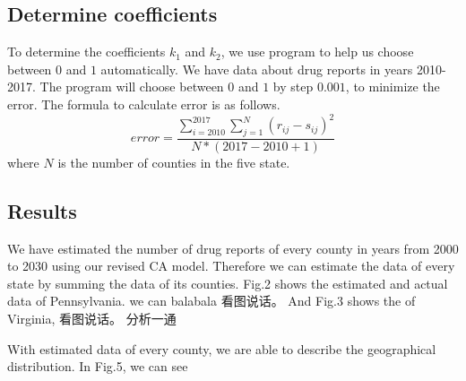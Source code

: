 		\subsection{Determine coefficients} \label{Section:Determine coefficients}
		To determine the coefficients $k_1$ and $k_2$, we use program to help us choose between $0$ and $1$ automatically. We have data about drug reports in years 2010-2017. The program will choose between $0$ and $1$ by step $0.001$, to minimize the error. The formula to calculate error is as follows.
			$$error = \frac{\sum_{i=2010}^{2017} \sum_{j=1}^{N} (r_{ij} - s_{ij})^2  }{N * (2017-2010+1)}$$
		where $N$ is the number of counties in the five state.


		\subsection{Results}
			We have estimated the number of drug reports of every county in years from 2000 to 2030 using our revised CA model. Therefore we can estimate the data of every state by summing the data of its counties. Fig.2 shows the estimated and actual data of Pennsylvania. we can balabala 看图说话。 And Fig.3 shows the   of Virginia, 看图说话。  分析一通

			With estimated data of every county, we are able to describe the geographical distribution. In Fig.5, we can see 







